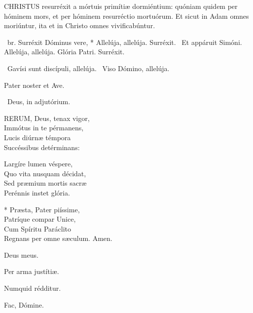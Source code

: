 


\lettrine[lines=2]{C}{HRISTUS} resurréxit a mórtuis primítiæ dormiéntium: quóniam quidem per hóminem mors, et per hóminem resurréctio mortuórum. Et sicut in Adam omnes moriúntur, ita et in Christo omnes vivificabúntur.

\R\ br. Surréxit Dóminus vere, * Allelúja, allelúja. Surréxit. \V\ Et appáruit Simóni. Allelúja, allelúja. Glória Patri. Surréxit.

\V\ Gavísi sunt discípuli, allelúja. \R\ Viso Dómino, allelúja.


\sectionornament


Pater noster et Ave.

\V\ Deus, in adjutórium.


\lettrine[lines=2]{R}{ERUM}, Deus, tenax vigor,\\
Immótus in te pérmanens,\\
Lucis diúrnæ témpora\\
Succéssibus detérminans:

Largíre lumen véspere,\\
Quo vita nusquam décidat,\\
Sed præmium mortis sacræ\\
Perénnis instet glória.

* Præsta, Pater piíssime,\\
Patríque compar Unice,\\
Cum Spíritu Paráclito\\
Regnans per omne sæculum. Amen.

  Deus meus.



 Per arma justítiæ.


 Numquid rédditur.


 Fac, Dómine.

